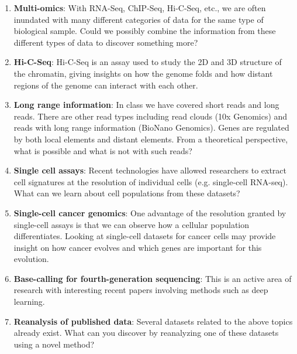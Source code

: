 \documentclass[11pt,onecolumn]{article}
\begin{document}
\begin{enumerate}
	\item \textbf{Multi-omics}: With RNA-Seq, ChIP-Seq, Hi-C-Seq, etc., we are often inundated with many different categories of data for the same type of biological sample. Could we possibly combine the information from these different types of data to discover something more? 
	\item \textbf{Hi-C-Seq}: Hi-C-Seq is an assay used to study the 2D and 3D structure of the chromatin, giving insights on how the genome folds and how distant regions of the genome can interact with each other.
	\item \textbf{Long range information}: In class we have covered short reads and long reads. There are other read types including read clouds (10x Genomics) and reads with long range information (BioNano Genomics). Genes are regulated by both local elements and distant elements. From a theoretical perspective, what is possible and what is not with such reads?
	\item \textbf{Single cell assays}: Recent technologies have allowed researchers to extract cell signatures at the resolution of individual cells (e.g. single-cell RNA-seq). What can we learn about cell populations from these datasets?
	\item \textbf{Single-cell cancer genomics}: One advantage of the resolution granted by single-cell assays is that we can observe how a cellular population differentiates. Looking at single-cell datasets for cancer cells may provide insight on how cancer evolves and which genes are important for this evolution.
	\item \textbf{Base-calling for fourth-generation sequencing}: This is an active area of research with interesting recent papers involving methods such as deep learning. 
	\item \textbf{Reanalysis of published data}: Several datasets related to the above topics already exist. What can you discover by reanalyzing one of these datasets using a novel method? 
\end{enumerate}
\end{document}
